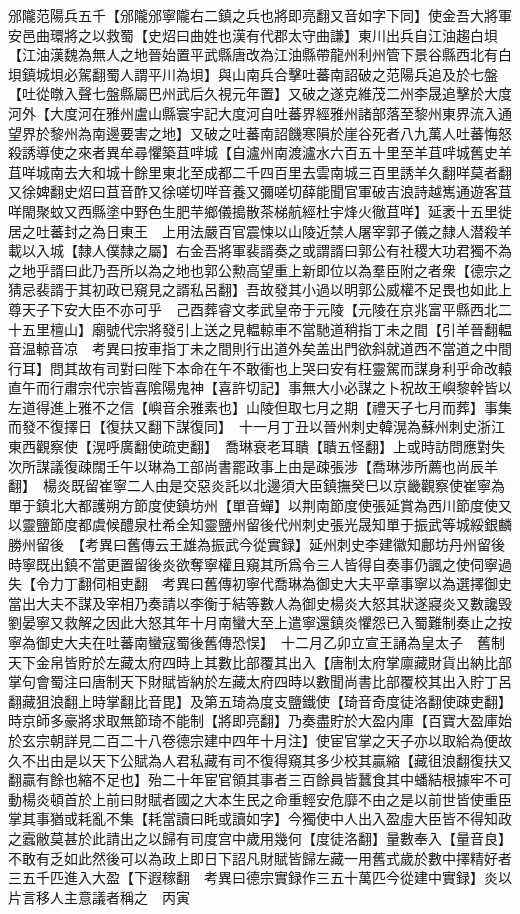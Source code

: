 邠隴范陽兵五千【邠隴邠寧隴右二鎮之兵也將即亮翻又音如字下同】使金吾大將軍安邑曲環將之以救蜀【史炤曰曲姓也漢有代郡太守曲謙】東川出兵自江油趨白垻【江油漢魏為無人之地晉始置平武縣唐改為江油縣帶龍州利州管下景谷縣西北有白垻鎮城垻必駕翻蜀人謂平川為垻】與山南兵合擊吐蕃南詔破之范陽兵追及於七盤【吐從暾入聲七盤縣屬巴州武后久視元年置】又破之遂克維茂二州李晟追擊於大度河外【大度河在雅州盧山縣寰宇記大度河自吐蕃界經雅州諸部落至黎州東界流入通望界於黎州為南邊要害之地】又破之吐蕃南詔饑寒隕於崖谷死者八九萬人吐蕃悔怒殺誘導使之來者異牟尋懼築苴哶城【自瀘州南渡瀘水六百五十里至羊苴哶城舊史羊苴咩城南去大和城十餘里東北至成都二千四百里去雲南城三百里誘羊久翻咩莫者翻又徐婢翻史炤曰苴音酢又徐嗟切咩音養又彌嗟切薛能聞官軍破吉浪詩越嶲通遊客苴咩閙聚蚊又西縣塗中野色生肥芉鄉儀搗散茶梯航經杜宇烽火徹苴咩】延袤十五里徙居之吐蕃封之為日東王　上用法嚴百官震悚以山陵近禁人屠宰郭子儀之隸人潜殺羊載以入城【隸人僕隸之屬】右金吾將軍裴諝奏之或謂諝曰郭公有社稷大功君獨不為之地乎諝曰此乃吾所以為之地也郭公勲高望重上新即位以為羣臣附之者衆【德宗之猜忌裴諝于其初政已窺見之諝私呂翻】吾故發其小過以明郭公威權不足畏也如此上尊天子下安大臣不亦可乎　己酉葬睿文孝武皇帝于元陵【元陵在京兆富平縣西北二十五里檀山】廟號代宗將發引上送之見輼輬車不當馳道稍指丁未之間【引羊晉翻輼音温輬音凉　考異曰按車指丁未之間則行出道外矣盖出門欲斜就道西不當道之中間行耳】問其故有司對曰陛下本命在午不敢衝也上哭曰安有枉靈駕而謀身利乎命改轅直午而行肅宗代宗皆喜隂陽鬼神【喜許切記】事無大小必謀之卜祝故王嶼黎幹皆以左道得進上雅不之信【嶼音余雅素也】山陵但取七月之期【禮天子七月而葬】事集而發不復擇日【復扶又翻下謀復同】　十一月丁丑以晉州刺史韓滉為蘇州刺史浙江東西觀察使【滉呼廣翻使疏吏翻】　喬琳衰老耳聵【聵五怪翻】上或時訪問應對失次所謀議復疎闊壬午以琳為工部尚書罷政事上由是疎張涉【喬琳涉所薦也尚辰羊翻】　楊炎既留崔寧二人由是交惡炎託以北邊須大臣鎮撫癸巳以京畿觀察使崔寧為單于鎮北大都護朔方節度使鎮坊州【單音蟬】以荆南節度使張延賞為西川節度使又以靈鹽節度都虞候醴泉杜希全知靈鹽州留後代州刺史張光晟知單于振武等城綏銀麟勝州留後　【考異曰舊傳云王雄為振武今從實録】延州刺史李建徽知鄜坊丹州留後時寧既出鎮不當更置留後炎欲奪寧權且窺其所爲令三人皆得自奏事仍諷之使伺寧過失【令力丁翻伺相吏翻　考異曰舊傳初寧代喬琳為御史大夫平章事寧以為選擇御史當出大夫不謀及宰相乃奏請以李衡于結等數人為御史楊炎大怒其狀遂寢炎又數讒毁劉晏寧又救解之因此大怒其年十月南蠻大至上遣寧還鎮炎懼怨已入蜀難制奏止之按寧為御史大夫在吐蕃南蠻寇蜀後舊傳恐悮】　十二月乙卯立宣王誦為皇太子　舊制天下金帛皆貯於左藏太府四時上其數比部覆其出入【唐制太府掌廪藏財貨出納比部掌句會蜀注曰唐制天下財賦皆納於左藏太府四時以數聞尚書比部覆校其出入貯丁呂翻藏狙浪翻上時掌翻比音毘】及第五琦為度支鹽鐵使【琦音奇度徒洛翻使疎吏翻】時京師多豪將求取無節琦不能制【將即亮翻】乃奏盡貯於大盈内庫【百寶大盈庫始於玄宗朝詳見二百二十八卷德宗建中四年十月注】使宦官掌之天子亦以取給為便故久不出由是以天下公賦為人君私藏有司不復得窺其多少校其贏縮【藏徂浪翻復扶又翻贏有餘也縮不足也】殆二十年宦官領其事者三百餘員皆蠶食其中蟠結根據牢不可動楊炎頓首於上前曰財賦者國之大本生民之命重輕安危靡不由之是以前世皆使重臣掌其事猶或耗亂不集【耗當讀曰眊或讀如字】今獨使中人出入盈虛大臣皆不得知政之蠧敝莫甚於此請出之以歸有司度宫中歲用幾何【度徒洛翻】量數奉入【量音良】不敢有乏如此然後可以為政上即日下詔凡財賦皆歸左藏一用舊式歲於數中擇精好者三五千匹進入大盈【下遐稼翻　考異曰德宗實録作三五十萬匹今從建中實録】炎以片言移人主意議者稱之　丙寅